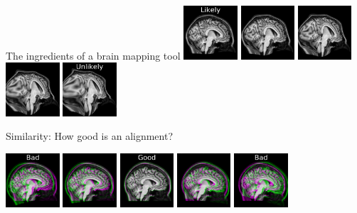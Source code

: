 \documentclass{beamer}
\begin{document}
\begin{frame}{The ingredients of a brain mapping tool}
\includegraphics[width=0.15\textwidth]{ex2_flow_n_1}
\includegraphics[width=0.15\textwidth]{ex2_flow_n_2}
\includegraphics[width=0.15\textwidth]{ex2_flow_n_3}
\includegraphics[width=0.15\textwidth]{ex2_flow_n_4}
\includegraphics[width=0.15\textwidth]{ex2_flow_n_5}



\vspace{1em}
Similarity: How good is an alignment?

\includegraphics[width=0.15\textwidth]{ex2_affine_n_1}
\includegraphics[width=0.15\textwidth]{ex2_affine_n_2}
\includegraphics[width=0.15\textwidth]{ex2_affine_n_3}
\includegraphics[width=0.15\textwidth]{ex2_affine_n_4}
\includegraphics[width=0.15\textwidth]{ex2_affine_n_5}



\end{frame}
\end{document}
